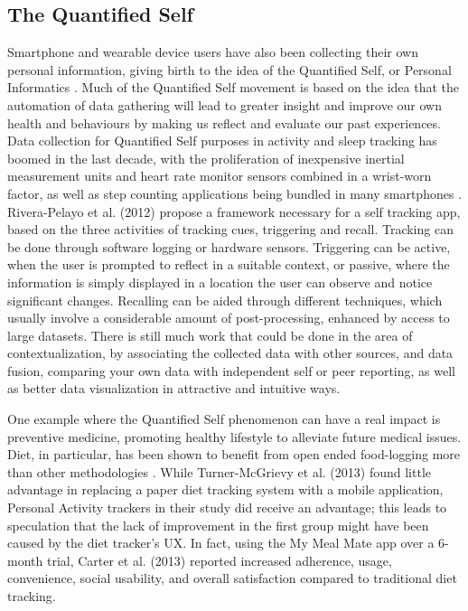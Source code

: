\subsection{The Quantified Self}
Smartphone and wearable device users have also been collecting their own personal information, giving birth to the idea of the Quantified Self, or Personal Informatics \cite{rapp2014}.
Much of the Quantified Self movement is based on the idea that the automation of data gathering will lead to greater insight and improve our own health and behaviours by making us reflect and evaluate our past experiences. Data collection for Quantified Self purposes in activity and sleep tracking has boomed in the last decade, with the proliferation of inexpensive inertial measurement units and heart rate monitor sensors combined in a wrist-worn factor, as well as step counting applications being bundled in many smartphones \cite{Crawford2015}.\\
Rivera-Pelayo et al. (2012)\cite{Rivera-Pelayo2012} propose a framework necessary for a self tracking app, based on the three activities of tracking cues, triggering and recall.
Tracking can be done through software logging or hardware sensors. Triggering can be active, when the user is prompted to reflect in a suitable context, or passive, where the information is simply displayed in a location the user can observe and notice significant changes. Recalling can be aided through different techniques, which usually involve a considerable amount of post-processing, enhanced by access to large datasets. There is still much work that could be done in the area of contextualization, by associating the collected data with other sources, and data fusion, comparing your own data with independent self or peer reporting, as well as better data visualization in attractive and intuitive ways.

One example where the Quantified Self phenomenon can have a real impact is preventive medicine, promoting healthy lifestyle to alleviate future medical issues. Diet, in particular, has been shown to benefit from open ended food-logging more than other methodologies \cite{Bingham1994}. While Turner-McGrievy et al. (2013)\cite{Turner-McGrievy2013} found little advantage in replacing a paper diet tracking system with a mobile application, Personal Activity trackers in their study did receive an advantage; this leads to speculation that the lack of improvement in the first group might have been caused by the diet tracker's UX. In fact, using the My Meal Mate app over a 6-month trial, Carter et al. (2013)\cite{carter2013adherence} reported increased adherence, usage, convenience, social usability, and overall satisfaction compared to traditional diet tracking. 

